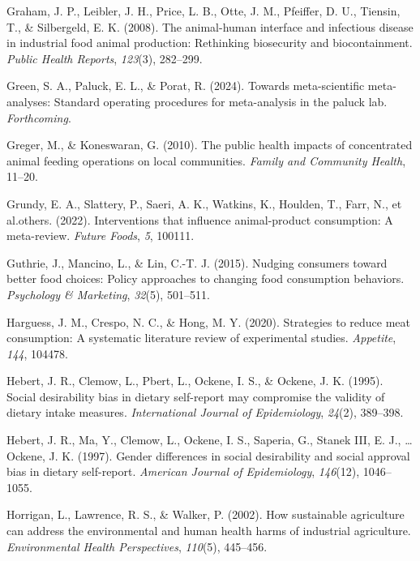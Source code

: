 \documentclass[
  man]{apa6}
\newlength{\cslhangindent}
\newenvironment{CSLReferences}[2] %
 {\begin{list}{}{%
  \setlength{\itemindent}{0pt}
  \setlength{\leftmargin}{0pt}
  \setlength{\parsep}{0pt}
  \ifodd #1
   \setlength{\leftmargin}{\cslhangindent}
   \setlength{\itemindent}{-1\cslhangindent}
  \fi
  \setlength{\itemsep}{#2\baselineskip}}}
 {\end{list}}
\begin{document}
\begin{CSLReferences}{1}{0}
Graham, J. P., Leibler, J. H., Price, L. B., Otte, J. M., Pfeiffer, D. U., Tiensin, T., \& Silbergeld, E. K. (2008). The animal-human interface and infectious disease in industrial food animal production: Rethinking biosecurity and biocontainment. \emph{Public Health Reports}, \emph{123}(3), 282--299.

Green, S. A., Paluck, E. L., \& Porat, R. (2024). Towards meta-scientific meta-analyses: Standard operating procedures for meta-analysis in the paluck lab. \emph{Forthcoming}.

Greger, M., \& Koneswaran, G. (2010). The public health impacts of concentrated animal feeding operations on local communities. \emph{Family and Community Health}, 11--20.

Grundy, E. A., Slattery, P., Saeri, A. K., Watkins, K., Houlden, T., Farr, N., et al.others. (2022). Interventions that influence animal-product consumption: A meta-review. \emph{Future Foods}, \emph{5}, 100111.

Guthrie, J., Mancino, L., \& Lin, C.-T. J. (2015). Nudging consumers toward better food choices: Policy approaches to changing food consumption behaviors. \emph{Psychology \& Marketing}, \emph{32}(5), 501--511.

Harguess, J. M., Crespo, N. C., \& Hong, M. Y. (2020). Strategies to reduce meat consumption: A systematic literature review of experimental studies. \emph{Appetite}, \emph{144}, 104478.

Hebert, J. R., Clemow, L., Pbert, L., Ockene, I. S., \& Ockene, J. K. (1995). Social desirability bias in dietary self-report may compromise the validity of dietary intake measures. \emph{International Journal of Epidemiology}, \emph{24}(2), 389--398.

Hebert, J. R., Ma, Y., Clemow, L., Ockene, I. S., Saperia, G., Stanek III, E. J., \ldots{} Ockene, J. K. (1997). Gender differences in social desirability and social approval bias in dietary self-report. \emph{American Journal of Epidemiology}, \emph{146}(12), 1046--1055.

Horrigan, L., Lawrence, R. S., \& Walker, P. (2002). How sustainable agriculture can address the environmental and human health harms of industrial agriculture. \emph{Environmental Health Perspectives}, \emph{110}(5), 445--456.


\end{CSLReferences}
\end{document}
